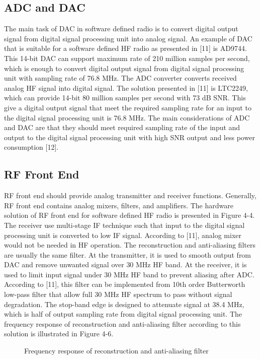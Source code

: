 \documentclass[conference]{IEEEtran}
\begin{document}
\subsection{ADC and DAC}
The main task of DAC in software defined radio is to convert digital output signal from digital signal processing unit into analog signal. An example of DAC that is suitable for a software defined HF radio as presented in [11] is AD9744. This 14-bit DAC can support maximum rate of 210 million samples per second, which is enough to convert digital output signal from digital signal processing unit with sampling rate of 76.8 MHz.
The ADC converter converts received analog HF signal into digital signal. The solution presented in [11] is LTC2249, which can provide 14-bit 80 million samples per second with 73 dB SNR. This give a digital output signal that meet the required sampling rate for an input to the digital signal processing unit is 76.8 MHz. 
The main considerations of ADC and DAC are that they should meet required sampling rate of the input and output to the digital signal processing unit with high SNR output and less power consumption [12].
\subsection{RF Front End}
RF front end should provide analog transmitter and receiver functions. Generally, RF front end contains analog mixers, filters, and amplifiers. The hardware solution of RF front end for software defined HF radio is presented in Figure 4-4. The receiver use multi-stage IF technique such that input to the digital signal processing unit is converted to low IF signal. According to [11], analog mixer would not be needed in HF operation.
The reconstruction and anti-aliasing filters are usually the same filter. At the transmitter, it is used to smooth output from DAC and remove unwanted signal over 30 MHz HF band. At the receiver, it is used to limit input signal under 30 MHz HF band to prevent aliasing after ADC. According to [11], this filter can be implemented from 10th order Butterworth low-pass filter that allow full 30 MHz HF spectrum to pass without signal degradation. The stop-band edge is designed to attenuate signal at 38.4 MHz, which is half of output sampling rate from digital signal processing unit. The frequency response of reconstruction and anti-aliasing filter according to this solution is illustrated in Figure 4-6.

\begin{figure}[h!]
	\centering
	\caption{Frequency response of reconstruction and anti-aliasing filter}
\end{figure}
\end{document}

